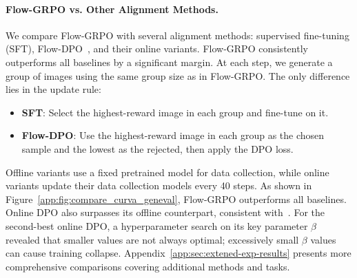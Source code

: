 \paragraph{Flow-GRPO vs. Other Alignment Methods.}
We compare Flow-GRPO with several alignment methods: supervised fine-tuning (SFT), Flow-DPO~\cite{videoalign,wallace2024diffusion}, and their online variants. Flow-GRPO consistently outperforms all baselines by a significant margin.
At each step, we generate a group of images using the same group size as in Flow-GRPO. The only difference lies in the update rule:
\begin{itemize}
\setlength{\itemindent}{-2em}
\item \textbf{SFT}: Select the highest-reward image in each group and fine-tune on it.
\item \textbf{Flow-DPO}: Use the highest-reward image in each group as the chosen sample and the lowest as the rejected, then apply the DPO loss.
\end{itemize}

Offline variants use a fixed pretrained model for data collection, while online variants update their data collection models every 40 steps. As shown in Figure~\ref{app:fig:compare_curva_geneval}, Flow-GRPO outperforms all baselines. Online DPO also surpasses its offline counterpart, consistent with~\cite{skyreels_v2}. For the second-best online DPO, a hyperparameter search on its key parameter $\beta$ revealed that smaller values are not always optimal; excessively small $\beta$ values can cause training collapse. Appendix~\ref{app:sec:extened-exp-results} presents more comprehensive comparisons covering additional methods and tasks.



